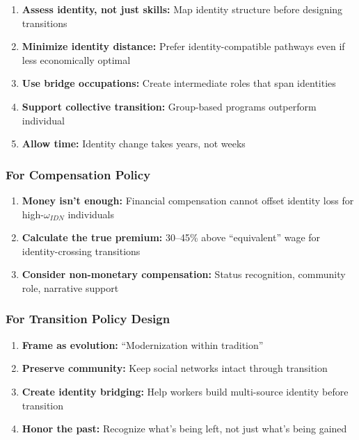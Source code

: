 \begin{enumerate}
    \item \textbf{Assess identity, not just skills:} Map identity structure before 
    designing transitions
    \item \textbf{Minimize identity distance:} Prefer identity-compatible pathways 
    even if less economically optimal
    \item \textbf{Use bridge occupations:} Create intermediate roles that span identities
    \item \textbf{Support collective transition:} Group-based programs outperform individual
    \item \textbf{Allow time:} Identity change takes years, not weeks
\end{enumerate}

\subsubsection{For Compensation Policy}

\begin{enumerate}
    \item \textbf{Money isn't enough:} Financial compensation cannot offset 
    identity loss for high-$\omega_{IDN}$ individuals
    \item \textbf{Calculate the true premium:} 30--45\% above ``equivalent'' 
    wage for identity-crossing transitions
    \item \textbf{Consider non-monetary compensation:} Status recognition, 
    community role, narrative support
\end{enumerate}

\subsubsection{For Transition Policy Design}

\begin{enumerate}
    \item \textbf{Frame as evolution:} ``Modernization within tradition''
    \item \textbf{Preserve community:} Keep social networks intact through transition
    \item \textbf{Create identity bridging:} Help workers build multi-source identity 
    before transition
    \item \textbf{Honor the past:} Recognize what's being left, not just what's being gained
\end{enumerate}

